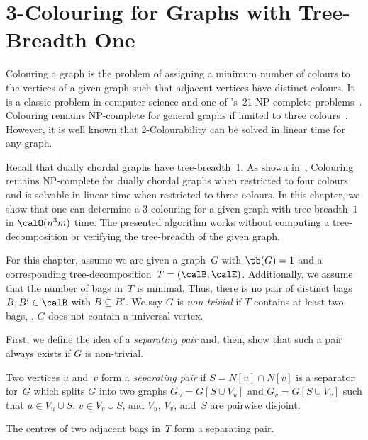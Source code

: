 \chapter{3-Colouring for Graphs with Tree-Breadth One}
    \label{cha:3colouring}
%

\newcommand{\Guv}{G \langle uv \rangle}

Colouring a graph is the problem of assigning a minimum number of colours to the vertices of a given graph such that adjacent vertices have distinct colours.
It is a classic problem in computer science and one of 's~21 NP-complete problems~\cite{Karp1972}.
Colouring remains NP-complete for general graphs if limited to three colours~\cite{Stockmeyer1973}.
However, it is well known that 2-Colourability can be solved in linear time for any graph.

Recall that dually chordal graphs have tree-breadth~$1$.
As shown in~\cite{LeitertMan}, Colouring remains NP-complete for dually chordal graphs when restricted to four colours and is solvable in linear time when restricted to three colours.
In this chapter, we show that one can determine a 3-colouring for a given graph with tree-breadth~$1$ in $\calO(n^3m)$ time.
The presented algorithm works without computing a tree-decomposition or verifying the tree-breadth of the given graph.

For this chapter, assume we are given a graph~$G$ with $\tb(G) = 1$ and a corresponding tree-decomposition~$T = (\calB, \calE)$.
Additionally, we assume that the number of bags in~$T$ is minimal.
Thus, there is no pair of distinct bags~$B, B' \in \calB$ with $B \subseteq B'$.
We say $G$ is \emph{non-trivial} if $T$ contains at least two bags, \ie, $G$ does not contain a universal vertex.

First, we define the idea of a \emph{separating pair} and, then, show that such a pair always exists if $G$ is non-trivial.

\begin{definition}
    \label{def:SeparatingPair}
Two vertices \( u \) and~\( v \) form a \emph{separating pair} if \( S = N[u] \cap N[v] \) is a separator for~\( G \) which splits \( G \) into two graphs \( G_u = G[S \cup V_u] \) and \( G_v = G[S \cup V_v] \) such that \( u \in V_u \cup S \), \( v \in V_v \cup S \), and \( V_u \), \( V_v \), and~\( S \) are pairwise disjoint.
\end{definition}

\begin{lemma}
    \label{lem:centresOfBagsAreSepPair}
The centres of two adjacent bags in~$T$ form a separating pair.
\end{lemma}

